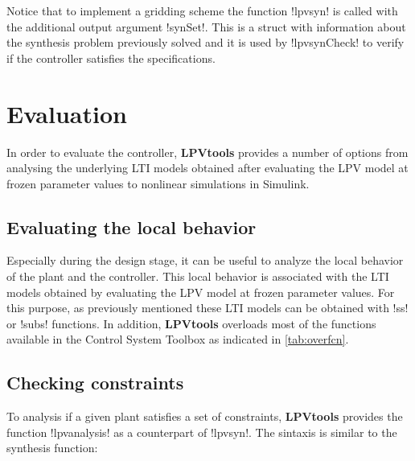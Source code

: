 \documentclass[fleqn,11pt]{article}
\newcommand{\lpvtool}{\textbf{LPVtools}\xspace}
\begin{document}
Notice that to implement a gridding scheme the function !lpvsyn! is called with the additional output argument !synSet!. This is a struct with information about the synthesis problem previously solved and it is used by !lpvsynCheck! to verify if the controller satisfies the specifications.



\section{Evaluation}\label{sec:Eval}

In order to evaluate the controller, \lpvtool provides a number of options from analysing the underlying LTI models obtained after evaluating the LPV model at frozen parameter values to nonlinear simulations in Simulink.

\subsection{Evaluating the local behavior}\label{ssec:evalLocal}

Especially during the design stage, it can be useful to analyze the local behavior of the plant and the controller. This local behavior is associated with the LTI models obtained by evaluating the LPV model at frozen parameter values. For this purpose, as previously mentioned these LTI models can be obtained with !ss! or !subs! functions. In addition, \lpvtool overloads most of the functions available in the Control System Toolbox as indicated in \cref{tab:overfcn}.


\subsection{Checking constraints}\label{ssec:evalCheck}

To analysis if a given plant satisfies a set of constraints, \lpvtool provides the function !lpvanalysis! as a counterpart of !lpvsyn!. The sintaxis is similar to the synthesis function:
\end{document}
